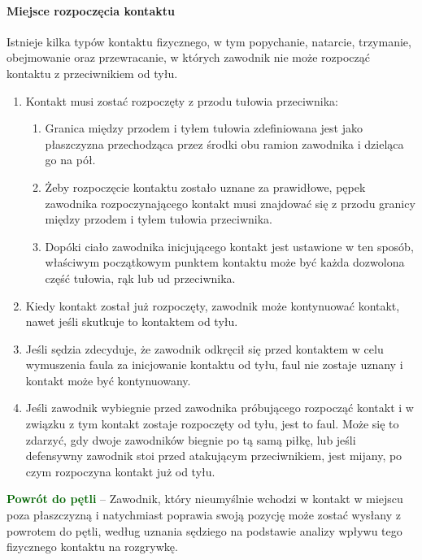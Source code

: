 \documentclass[12pt]{article}
\newcommand\other[1]{\bgroup\textcolor{darkgreen}{\textbf{#1}}}
\begin{document}
\paragraph{Miejsce rozpoczęcia kontaktu}
Istnieje kilka typów
kontaktu fizycznego, w tym popychanie, natarcie, trzymanie, obejmowanie
oraz przewracanie, w których zawodnik nie może rozpocząć kontaktu z
przeciwnikiem od tyłu.

\begin{enumerate}
	\item
	      Kontakt musi zostać rozpoczęty z przodu tułowia przeciwnika:

	      \begin{enumerate}
		      \item
		            Granica między przodem i tyłem tułowia zdefiniowana jest jako
		            płaszczyzna przechodząca przez środki obu ramion zawodnika i
		            dzieląca go na pół.
		      \item
		            Żeby rozpoczęcie kontaktu zostało uznane za prawidłowe, pępek
		            zawodnika rozpoczynającego kontakt musi znajdować się z przodu
		            granicy między przodem i tyłem tułowia przeciwnika.
		      \item
		            Dopóki ciało zawodnika inicjującego kontakt jest ustawione w ten
		            sposób, właściwym początkowym punktem kontaktu może być każda
		            dozwolona część tułowia, rąk lub ud przeciwnika.
	      \end{enumerate}
	\item
	      Kiedy kontakt został już rozpoczęty, zawodnik może kontynuować
	      kontakt, nawet jeśli skutkuje to kontaktem od tyłu.
	\item
	      Jeśli sędzia zdecyduje, że zawodnik odkręcił się przed kontaktem w
	      celu wymuszenia faula za inicjowanie kontaktu od tyłu, faul nie
	      zostaje uznany i kontakt może być kontynuowany.
	\item
	      Jeśli zawodnik wybiegnie przed zawodnika próbującego rozpocząć kontakt
	      i w związku z tym kontakt zostaje rozpoczęty od tyłu, jest to faul.
	      Może się to zdarzyć, gdy dwoje zawodników biegnie po tą samą piłkę,
	      lub jeśli defensywny zawodnik stoi przed atakującym przeciwnikiem,
	      jest mijany, po czym rozpoczyna kontakt już od tyłu.
\end{enumerate}

\other{Powrót do pętli} -- Zawodnik, który nieumyślnie wchodzi w kontakt w
miejscu poza płaszczyzną i natychmiast poprawia swoją pozycję może
zostać wysłany z powrotem do pętli, według uznania sędziego na podstawie
analizy wpływu tego fizycznego kontaktu na rozgrywkę.
\end{document}
